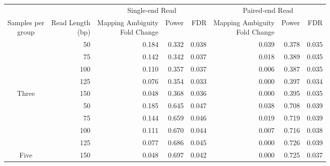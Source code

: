 
\begin{tabular}[t]{crrrrrrr}
\toprule
\multicolumn{2}{c}{ } & \multicolumn{3}{c}{Single-end Read} & \multicolumn{3}{c}{Paired-end Read} \\
\cmidrule(l{3pt}r{3pt}){3-5} \cmidrule(l{3pt}r{3pt}){6-8}
\makecell[c]{Samples per\\group} & \makecell[c]{Read Length\\(bp)} & \makecell[c]{Mapping Ambiguity\\Fold Change} & Power & FDR & \makecell[c]{Mapping Ambiguity\\Fold Change} & Power & FDR\\
\midrule
 & 50 & 0.184 & 0.332 & 0.038 & 0.039 & 0.378 & 0.035\\

 & 75 & 0.142 & 0.342 & 0.037 & 0.018 & 0.389 & 0.035\\

 & 100 & 0.110 & 0.357 & 0.037 & 0.006 & 0.387 & 0.035\\

 & 125 & 0.076 & 0.354 & 0.033 & 0.000 & 0.397 & 0.034\\

\multirow{-5}{*}{\centering\arraybackslash Three} & 150 & 0.048 & 0.368 & 0.036 & 0.000 & 0.395 & 0.035\\
\cmidrule{1-8}
 & 50 & 0.185 & 0.645 & 0.047 & 0.038 & 0.708 & 0.039\\

 & 75 & 0.144 & 0.659 & 0.046 & 0.019 & 0.719 & 0.039\\

 & 100 & 0.111 & 0.670 & 0.044 & 0.007 & 0.716 & 0.038\\

 & 125 & 0.077 & 0.686 & 0.045 & 0.000 & 0.726 & 0.039\\

\multirow{-5}{*}{\centering\arraybackslash Five} & 150 & 0.048 & 0.697 & 0.042 & 0.000 & 0.725 & 0.037\\
\bottomrule
\end{tabular}

